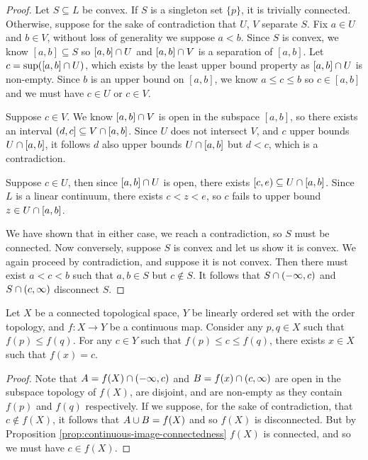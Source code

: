 \begin{proof}
    Let $S \subseteq L$ be convex. If $S$ is a singleton set $\{p\}$, it is trivially connected. Otherwise, suppose for the sake of contradiction that $U$, $V$ separate $S$. Fix $a \in U$ and $b \in V$, without loss of generality we suppose $a < b$. Since $S$ is convex, we know $[a, b] \subseteq S$ so $[a, b] \cap U$ and $[a, b] \cap V$ is a separation of $[a, b]$. Let $c = \sup ([a, b] \cap U)$, which exists by the least upper bound property as $[a, b] \cap U$ is non-empty. Since $b$ is an upper bound on $[a, b]$, we know $a \leq c \leq b$ so $c \in [a, b]$ and we must have $c \in U$ or $c \in V$.

    Suppose $c \in V$. We know $[a, b] \cap V$ is open in the subspace $[a, b]$, so there exists an interval $(d, c] \subseteq V \cap [a, b]$. Since $U$ does not intersect $V$, and $c$ upper bounds $U \cap [a, b]$, it follows $d$ also upper bounds $U \cap [a, b]$ but $d < c$, which is a contradiction.

    Suppose $c \in U$, then since $[a, b] \cap U$ is open, there exists $[c, e) \subseteq U \cap [a, b]$. Since $L$ is a linear continuum, there exists $c < z < e$, so $c$ fails to upper bound $z \in U \cap [a, b]$.

    We have shown that in either case, we reach a contradiction, so $S$ must be connected. Now conversely, suppose $S$ is convex and let us show it is convex. We again proceed by contradiction, and suppose it is not convex. Then there must exist $a < c < b$ such that $a, b \in S$ but $c \not\in S$. It follows that $S \cap (-\infty, c)$ and $S \cap (c, \infty)$ disconnect $S$.
\end{proof}

\begin{thm}
    Let $X$ be a connected topological space, $Y$ be linearly ordered set with the order topology, and $f: X \to Y$ be a continuous map. Consider any $p, q \in X$ such that $f(p) \leq f(q)$. For any $c \in Y$ such that $f(p) \leq c \leq f(q)$, there exists $x \in X$ such that $f(x) = c$.
\end{thm}

\begin{proof}
    Note that $A = f(X) \cap (-\infty, c)$ and $B = f(x) \cap (c, \infty)$ are open in the subspace topology of $f(X)$, are disjoint, and are non-empty as they contain $f(p)$ and $f(q)$ respectively. If we suppose, for the sake of contradiction, that $c \not\in f(X)$, it follows that $A \cup B = f(X)$ and so $f(X)$ is disconnected. But by Proposition \ref{prop:continuous-image-connectedness} $f(X)$ is connected, and so we must have $c \in f(X)$.
\end{proof}

